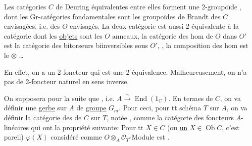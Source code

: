 Les catégories $C$ de Deuring équivalentes entre elles forment une  2-groupoïde , dont les  Gr-catégories fondamentales sont les groupoïdes de Brandt des $C$ envisagées, i.e. des $O$ envisagés. La deux-catégorie est aussi 2-équivalente à la catégorie   dont les \uline{objets} sont les $O$   anneaux,  la catégorie des hom de $O$ dans $O'$ est la catégorie des bitorseurs biinversibles sous $O'$, , la composition des hom est le $\otimes$ \ldots
{}

En effet, on a un  2-foncteur
qui est une 2-équivalence. Malheureusement, on n'a pas de 2-foncteur naturel en sens inverse.

On supposera pour la suite que  , i.e. $A\xrightarrow{\sim}\operatorname{End}(1_C)$.
En termes de $C$, on va définir une \uline{gerbe} sur $A$ de \uline{groupe} $G_m$. Pour ceci, pour tt schéma  $T$ sur $A$, on va définir la catégorie des    de $C$ sur $T$, notée  , comme la catégorie des foncteurs $A$-  linéaires
qui ont la propriété suivante: Pour tt $X\in C$ (ou \uline{un} $X\in\operatorname{Ob}C$, c'est pareil)   $\varphi(X)$ considéré comme \deleted{\unsure{\varphi}} $O\otimes_A\mathcal O_T$-Module est  .

